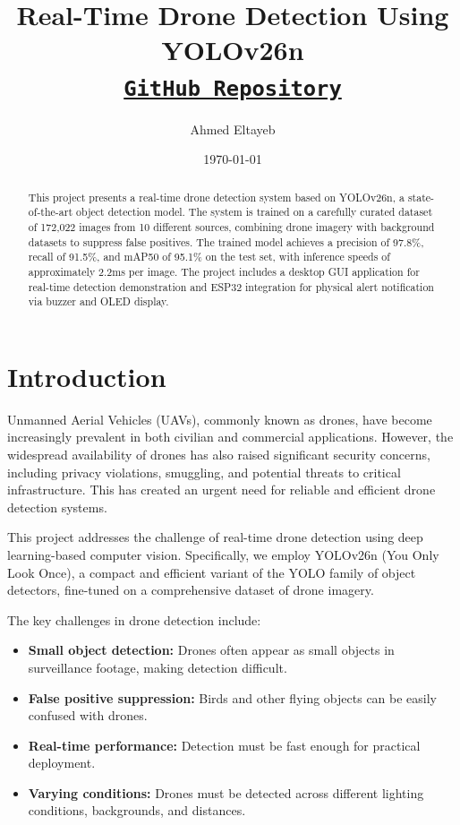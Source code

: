 \documentclass[a4paper,12pt]{report}
\title{Real-Time Drone Detection Using YOLOv26n\\
\vspace{0.5cm}\href{https://github.com/AEEltayeb/drone_detection_py}{\texttt{GitHub Repository}}}
\author{Ahmed Eltayeb}
\date{\today}
\begin{document}
\maketitle

\begin{abstract}
This project presents a real-time drone detection system based on YOLOv26n, a state-of-the-art object detection model. The system is trained on a carefully curated dataset of 172,022 images from 10 different sources, combining drone imagery with background datasets to suppress false positives. The trained model achieves a precision of 97.8\%, recall of 91.5\%, and mAP50 of 95.1\% on the test set, with inference speeds of approximately 2.2ms per image. The project includes a desktop GUI application for real-time detection demonstration and ESP32 integration for physical alert notification via buzzer and OLED display.
\end{abstract}

\tableofcontents
\newpage

\listoffigures
\newpage

\listoftables
\newpage

\chapter{Introduction}

Unmanned Aerial Vehicles (UAVs), commonly known as drones, have become increasingly prevalent in both civilian and commercial applications. However, the widespread availability of drones has also raised significant security concerns, including privacy violations, smuggling, and potential threats to critical infrastructure. This has created an urgent need for reliable and efficient drone detection systems.

This project addresses the challenge of real-time drone detection using deep learning-based computer vision. Specifically, we employ YOLOv26n (You Only Look Once), a compact and efficient variant of the YOLO family of object detectors, fine-tuned on a comprehensive dataset of drone imagery.

The key challenges in drone detection include:
\begin{itemize}
    \item \textbf{Small object detection:} Drones often appear as small objects in surveillance footage, making detection difficult.
    \item \textbf{False positive suppression:} Birds and other flying objects can be easily confused with drones.
    \item \textbf{Real-time performance:} Detection must be fast enough for practical deployment.
    \item \textbf{Varying conditions:} Drones must be detected across different lighting conditions, backgrounds, and distances.
\end{itemize}
\end{document}
